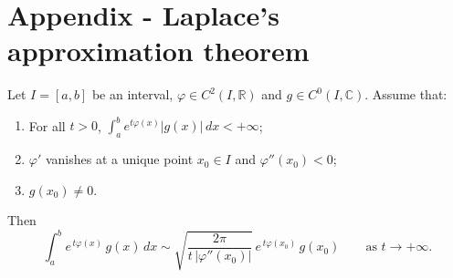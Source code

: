 \documentclass{article}
\begin{document}
\appendix
\section{Appendix - Laplace's approximation theorem}
Let $I=[a,b]$ be an interval, $\varphi\in C^2(I,\mathbb{R})$
and $g\in C^0(I,\mathbb{C})$. Assume that:
\begin{enumerate}
    \item[(i)] For all $t>0$, $\displaystyle \int_a^b e^{t\varphi(x)} |g(x)|\,dx < +\infty$;
    \item[(ii)] $\varphi'$ vanishes at a unique point $x_0\in I$ and $\varphi''(x_0)<0$;
    \item[(iii)] $g(x_0)\neq 0$.
\end{enumerate}
Then
\[
\int_a^b e^{\,t\varphi(x)}\, g(x)\,dx
\sim
\sqrt{\frac{2\pi}{t\,|\varphi''(x_0)|}}\,
e^{\,t\varphi(x_0)}\, g(x_0)
\qquad\text{as } t\to +\infty .\]
\end{document}
